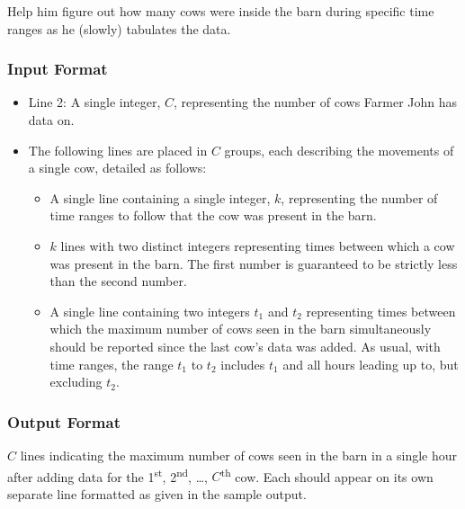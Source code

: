 Help him figure out how many cows were inside the barn during specific time ranges as he (slowly) tabulates the data.

\subsubsection{Input Format}

\begin{itemize}
    \item Line 2: A single integer, $C$, representing the number of cows Farmer John has data on.

    \item The following lines are placed in $C$ groups, each describing the movements of a single cow, detailed as follows:
    \begin{itemize}
        \item A single line containing a single integer, $k$, representing the number of time ranges to follow that the cow was present in the barn.

        \item $k$ lines with two distinct integers representing times between which a cow was present in the barn.
        The first number is guaranteed to be strictly less than the second number.
        \item A single line containing two integers $t_1$ and $t_2$ representing times between which the maximum number of cows seen in the barn simultaneously should be reported since the last cow's data was added.
        As usual, with time ranges, the range $t_1$ to $t_2$ includes $t_1$ and all hours leading up to, but excluding $t_2$.
    \end{itemize}
\end{itemize}


\subsubsection{Output Format}

$C$ lines indicating the maximum number of cows seen in the barn in a single hour after adding data for the 1\textsuperscript{st}, 2\textsuperscript{nd}, \ldots, $C$\textsuperscript{th} cow.
Each should appear on its own separate line formatted as given in the sample output.

